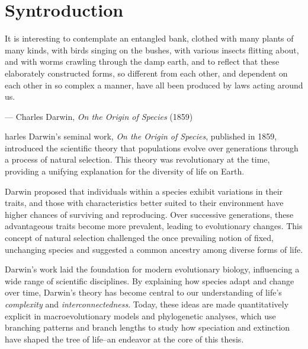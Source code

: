 \chapter{Syntroduction}
\label{syntroduction}

\begin{fancyquotes}[font=\small\itshape]
It is interesting to contemplate an entangled bank, clothed with many plants of many kinds, with birds singing on the bushes, with various insects flitting about, and with worms crawling through the damp earth, and to reflect that these elaborately constructed forms, so different from each other, and dependent on each other in so complex a manner, have all been produced by laws acting around us.
\end{fancyquotes}

\begin{flushright}
    — Charles Darwin, \textit{On the Origin of Species} (1859)
\end{flushright}

harles Darwin's seminal work, \textit{On the Origin of Species}, published in 1859, introduced the scientific theory that populations evolve over generations through a process of natural selection. This theory was revolutionary at the time, providing a unifying explanation for the diversity of life on Earth.

Darwin proposed that individuals within a species exhibit variations in their traits, and those with characteristics better suited to their environment have higher chances of surviving and reproducing. Over successive generations, these advantageous traits become more prevalent, leading to evolutionary changes. This concept of natural selection challenged the once prevailing notion of fixed, unchanging species and suggested a common ancestry among diverse forms of life. 

Darwin's work laid the foundation for modern evolutionary biology, influencing a wide range of scientific disciplines. By explaining how species adapt and change over time, Darwin's theory has become central to our understanding of life's \emph{complexity} and \emph{interconnectedness}. Today, these ideas are made quantitatively explicit in macroevolutionary models and phylogenetic analyses, which use branching patterns and branch lengths to study how speciation and extinction have shaped the tree of life--an endeavor at the core of this thesis.

